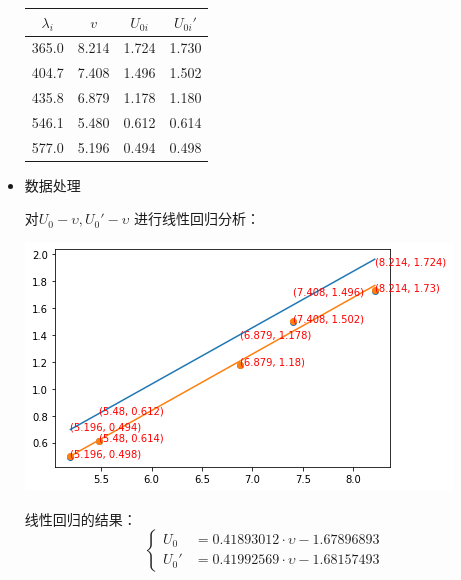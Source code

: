 \documentclass[a4paper]{ltxdoc}
\newenvironment{Figure}
  {\par\medskip\noindent\minipage{\linewidth}}
  {\endminipage\par\medskip}
\begin{document}
\begin{multicols}{2}
\begin{itemize}
\begin{Figure}
                  \smallskip
                  \begin{tabular}{|c|c|c|c|}
                      \hline $\lambda _i$ & $v$   & $U_{0i}$ & $U_{0i} \prime$ \\
                      \hline 365.0        & 8.214 & 1.724    & 1.730           \\
                      \hline 404.7        & 7.408 & 1.496    & 1.502           \\
                      \hline 435.8        & 6.879 & 1.178    & 1.180           \\
                      \hline 546.1        & 5.480 & 0.612    & 0.614           \\
                      \hline 577.0        & 5.196 & 0.494    & 0.498           \\ \hline
                  \end{tabular}
              \end{Figure}

        \item 数据处理

              对$U_0 - \upsilon,U_0\prime - \upsilon$ 进行线性回归分析：

              \begin{Figure}
                  \centering
                  \includegraphics[width=\linewidth]{5.png}
              \end{Figure}

              线性回归的结果：
              $$
                  \left\{
                  \begin{aligned}
                      U_0       & = 0.41893012 \cdot \upsilon - 1.67896893  \\
                      U_0\prime & =  0.41992569 \cdot \upsilon - 1.68157493
                  \end{aligned}
                  \right.
              $$


\end{itemize}
\end{multicols}
\end{document}
